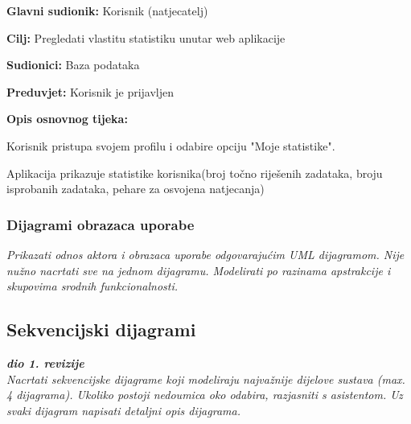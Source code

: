 					
					
					\noindent {}
					\begin{packed_item}
						
						\item \textbf{Glavni sudionik: }Korisnik (natjecatelj)
						\item \textbf{Cilj:} Pregledati vlastitu statistiku unutar web aplikacije
						\item \textbf{Sudionici:} Baza podataka
						\item \textbf{Preduvjet:} Korisnik je prijavljen
						\item \textbf{Opis osnovnog tijeka:}
						
						\item[] \begin{packed_enum}
							\item Korisnik pristupa svojem profilu i odabire opciju "Moje statistike".
							\item Aplikacija prikazuje statistike korisnika(broj točno riješenih zadataka, broju isprobanih zadataka, pehare za osvojena natjecanja)
						\end{packed_enum}
					\end{packed_item}

					
					
				
					
				\subsubsection{Dijagrami obrazaca uporabe}
					
					\textit{Prikazati odnos aktora i obrazaca uporabe odgovarajućim UML dijagramom. Nije nužno nacrtati sve na jednom dijagramu. Modelirati po razinama apstrakcije i skupovima srodnih funkcionalnosti.}
				\eject		
				
			\subsection{Sekvencijski dijagrami}
				
				\textbf{\textit{dio 1. revizije}}\\
				
				\textit{Nacrtati sekvencijske dijagrame koji modeliraju najvažnije dijelove sustava (max. 4 dijagrama). Ukoliko postoji nedoumica oko odabira, razjasniti s asistentom. Uz svaki dijagram napisati detaljni opis dijagrama.}
				\eject
	
